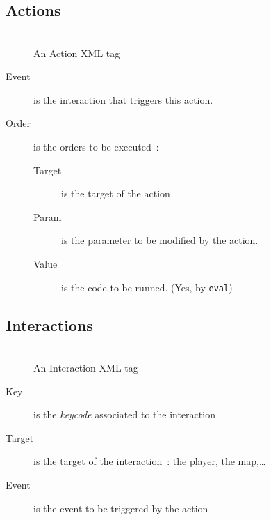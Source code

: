 \documentclass[a4paper, 11pt]{beamer}
\begin{document}
\subsection{Actions}

\begin{frame}[fragile]
    \frametitle{\subsecname}
    \begin{figure}
        \begin{adjustwidth}{0.1\textwidth}{}
            \scriptsize{\inputminted{xml}{test_files/actions.xml}}
        \end{adjustwidth}
        \caption{An Action XML tag}
    \end{figure}
    \begin{small}
        \begin{adjustwidth}{-0.1\textwidth}{}
            \begin{description}
                \item[Event] is the interaction that triggers this action.
                \item[Order] is the orders to be executed~:
                    \begin{description}
                        \item[Target] is the target of the action
                        \item[Param] is the parameter to be modified by the
                            action.
                        \item[Value] is the code to be runned. (Yes, by
                            \verb|eval|)
                    \end{description}
            \end{description}
        \end{adjustwidth}
    \end{small}
\end{frame}

\subsection{Interactions}

\begin{frame}
    \frametitle{\subsecname}
    \begin{figure}
        \begin{adjustwidth}{0.1\textwidth}{}
            \scriptsize{\inputminted{xml}{test_files/interactions.xml}}
        \end{adjustwidth}
        \caption{An Interaction XML tag}
    \end{figure}
    \begin{small}
        \begin{description}
            \item[Key] is the \emph{keycode} associated to the interaction
            \item[Target] is the target of the interaction~: the player, the
                map,\dots
            \item[Event] is the event to be triggered by the action
        \end{description}
    \end{small}
\end{frame}
\end{document}

